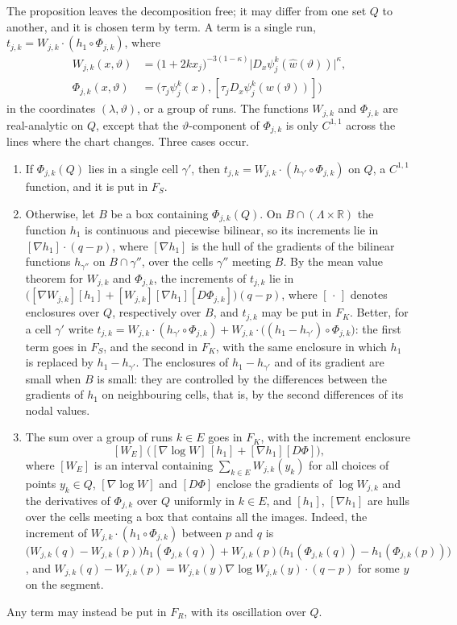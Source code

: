 \documentclass[11pt]{amsart}
\theoremstyle{definition}
\theoremstyle{remark}
\newcommand{\R}{\mathbb R}
\newcommand{\abs}[1]{\lvert #1\rvert}
\begin{document}
The proposition leaves the decomposition free; it may differ from one set $Q$ to another, and it is chosen term by term. A term is a single run, $t_{j,k}=W_{j,k}\cdot(h_1\circ\Phi_{j,k})$, where
\begin{align*}
  W_{j,k}(x,\vartheta)&=\bigl(1+2kx_j\bigr)^{-3(1-\kappa)}\abs{D_x\psi_j^k(\hat w(\vartheta))}^\kappa,\\
  \Phi_{j,k}(x,\vartheta)&=\bigl(\tau_j\psi_j^k(x),[\tau_jD_x\psi_j^k(w(\vartheta))]\bigr)
\end{align*}
in the coordinates $(\lambda,\vartheta)$, or a group of runs. The functions $W_{j,k}$ and $\Phi_{j,k}$ are real-analytic on $Q$, except that the $\vartheta$-component of $\Phi_{j,k}$ is only $C^{1,1}$ across the lines where the chart changes. Three cases occur.
\begin{enumerate}
\item[(a)] If $\Phi_{j,k}(Q)$ lies in a single cell $\gamma'$, then $t_{j,k}=W_{j,k}\cdot(h_{\gamma'}\circ\Phi_{j,k})$ on $Q$, a $C^{1,1}$ function, and it is put in $F_S$.
\item[(b)] Otherwise, let $B$ be a box containing $\Phi_{j,k}(Q)$. On $B\cap(\Lambda\times\R)$ the function $h_1$ is continuous and piecewise bilinear, so its increments lie in $[\nabla h_1]\cdot(q-p)$, where $[\nabla h_1]$ is the hull of the gradients of the bilinear functions $h_{\gamma''}$ on $B\cap\gamma''$, over the cells $\gamma''$ meeting $B$. By the mean value theorem for $W_{j,k}$ and $\Phi_{j,k}$, the increments of $t_{j,k}$ lie in $\bigl([\nabla W_{j,k}][h_1]+[W_{j,k}][\nabla h_1][D\Phi_{j,k}]\bigr)(q-p)$, where $[\,\cdot\,]$ denotes enclosures over $Q$, respectively over $B$, and $t_{j,k}$ may be put in $F_K$. Better, for a cell $\gamma'$ write $t_{j,k}=W_{j,k}\cdot(h_{\gamma'}\circ\Phi_{j,k})+W_{j,k}\cdot\bigl((h_1-h_{\gamma'})\circ\Phi_{j,k}\bigr)$: the first term goes in $F_S$, and the second in $F_K$, with the same enclosure in which $h_1$ is replaced by $h_1-h_{\gamma'}$. The enclosures of $h_1-h_{\gamma'}$ and of its gradient are small when $B$ is small: they are controlled by the differences between the gradients of $h_1$ on neighbouring cells, that is, by the second differences of its nodal values.
\item[(c)] The sum over a group of runs $k\in E$ goes in $F_K$, with the increment enclosure
\[
  [W_E]\,\bigl([\nabla\log W]\,[h_1]+[\nabla h_1][D\Phi]\bigr),
\]
where $[W_E]$ is an interval containing $\sum_{k\in E}W_{j,k}(y_k)$ for all choices of points $y_k\in Q$, $[\nabla\log W]$ and $[D\Phi]$ enclose the gradients of $\log W_{j,k}$ and the derivatives of $\Phi_{j,k}$ over $Q$ uniformly in $k\in E$, and $[h_1]$, $[\nabla h_1]$ are hulls over the cells meeting a box that contains all the images. Indeed, the increment of $W_{j,k}\cdot(h_1\circ\Phi_{j,k})$ between $p$ and $q$ is $\bigl(W_{j,k}(q)-W_{j,k}(p)\bigr)h_1(\Phi_{j,k}(q))+W_{j,k}(p)\bigl(h_1(\Phi_{j,k}(q))-h_1(\Phi_{j,k}(p))\bigr)$, and $W_{j,k}(q)-W_{j,k}(p)=W_{j,k}(y)\nabla\log W_{j,k}(y)\cdot(q-p)$ for some $y$ on the segment.
\end{enumerate}
Any term may instead be put in $F_R$, with its oscillation over $Q$.
\end{document}
